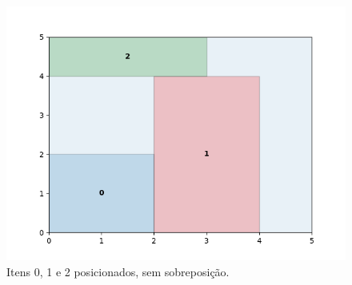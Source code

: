 \begin{figure}[H]
    \centering
    \includegraphics[scale=0.5]{utils/images/continuous_example3}
    \caption{Itens 0, 1 e 2 posicionados, sem sobreposição.}
    \label{fig:sobreposicao-dominio3}
\end{figure}
